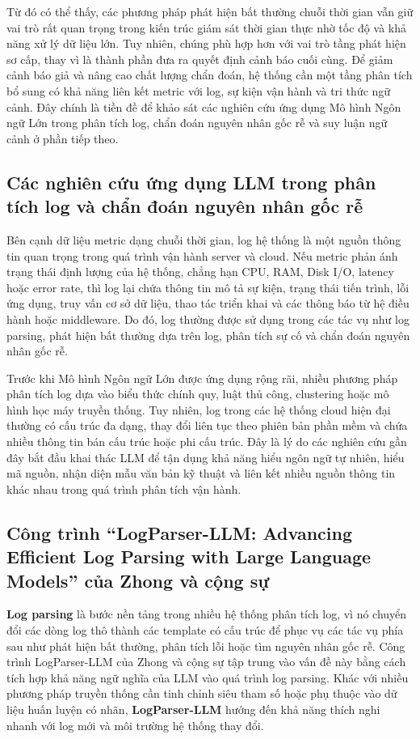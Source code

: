 Từ đó có thể thấy, các phương pháp phát hiện bất thường chuỗi thời gian vẫn giữ vai trò rất quan trọng trong kiến trúc giám sát thời gian thực nhờ tốc độ và khả năng xử lý dữ liệu lớn. Tuy nhiên, chúng phù hợp hơn với vai trò tầng phát hiện sơ cấp, thay vì là thành phần đưa ra quyết định cảnh báo cuối cùng. Để giảm cảnh báo giả và nâng cao chất lượng chẩn đoán, hệ thống cần một tầng phân tích bổ sung có khả năng liên kết metric với log, sự kiện vận hành và tri thức ngữ cảnh. Đây chính là tiền đề để khảo sát các nghiên cứu ứng dụng Mô hình Ngôn ngữ Lớn trong phân tích log, chẩn đoán nguyên nhân gốc rễ và suy luận ngữ cảnh ở phần tiếp theo.
\subsection{Các nghiên cứu ứng dụng LLM trong phân tích log và chẩn đoán nguyên nhân gốc rễ}

Bên cạnh dữ liệu metric dạng chuỗi thời gian, log hệ thống là một nguồn thông tin quan trọng trong quá trình vận hành server và cloud. Nếu metric phản ánh trạng thái định lượng của hệ thống, chẳng hạn CPU, RAM, Disk I/O, latency hoặc error rate, thì log lại chứa thông tin mô tả sự kiện, trạng thái tiến trình, lỗi ứng dụng, truy vấn cơ sở dữ liệu, thao tác triển khai và các thông báo từ hệ điều hành hoặc middleware. Do đó, log thường được sử dụng trong các tác vụ như log parsing, phát hiện bất thường dựa trên log, phân tích sự cố và chẩn đoán nguyên nhân gốc rễ.

Trước khi Mô hình Ngôn ngữ Lớn được ứng dụng rộng rãi, nhiều phương pháp phân tích log dựa vào biểu thức chính quy, luật thủ công, clustering hoặc mô hình học máy truyền thống. Tuy nhiên, log trong các hệ thống cloud hiện đại thường có cấu trúc đa dạng, thay đổi liên tục theo phiên bản phần mềm và chứa nhiều thông tin bán cấu trúc hoặc phi cấu trúc. Đây là lý do các nghiên cứu gần đây bắt đầu khai thác LLM để tận dụng khả năng hiểu ngôn ngữ tự nhiên, hiểu mã nguồn, nhận diện mẫu văn bản kỹ thuật và liên kết nhiều nguồn thông tin khác nhau trong quá trình phân tích vận hành.

\subsection*{Công trình “LogParser-LLM: Advancing Efficient Log Parsing with Large Language Models” của Zhong và cộng sự}

\textbf{Log parsing} là bước nền tảng trong nhiều hệ thống phân tích log, vì nó chuyển đổi các dòng log thô thành các template có cấu trúc để phục vụ các tác vụ phía sau như phát hiện bất thường, phân tích lỗi hoặc tìm nguyên nhân gốc rễ. Công trình LogParser-LLM của Zhong và cộng sự tập trung vào vấn đề này bằng cách tích hợp khả năng ngữ nghĩa của LLM vào quá trình log parsing. Khác với nhiều phương pháp truyền thống cần tinh chỉnh siêu tham số hoặc phụ thuộc vào dữ liệu huấn luyện có nhãn,\textbf{ LogParser-LLM} hướng đến khả năng thích nghi nhanh với log mới và môi trường hệ thống thay đổi.

